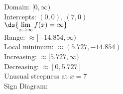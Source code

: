 \documentclass{ximera}
\begin{document}
\begin{enumerate}
\begin{multicols}{2}
\vfill
\columnbreak

Domain: $[0, \infty)$\\
Intercepts: $(0,0)$, $(7,0)$\\
$\ds{\lim_{x \rightarrow \infty} f(x) = \infty}$\\
Range:  $\approx [-14.854, \infty)$\\
Local minimum:  $\approx (5.727, -14.854)$\\
Increasing: $\approx [5.727, \infty)$\\
Decreasing: $\approx [0, 5.727]$\\
Unusual steepness at $x = 7$\\
Sign Diagram:\\

\smallskip

% 



\end{multicols}

\setcounter{HW}{\value{enumi}}
\end{enumerate}
\end{document}

